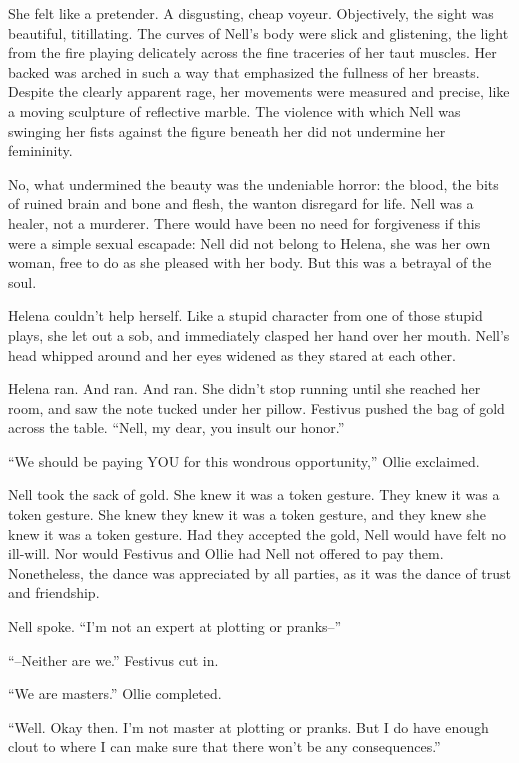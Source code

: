 She felt like a pretender. A disgusting, cheap voyeur. Objectively, the sight was beautiful, titillating. The curves of Nell’s body were slick and glistening, the light from the fire playing delicately across the fine traceries of her taut muscles. Her backed was arched in such a way that emphasized the fullness of her breasts. Despite the clearly apparent rage, her movements were measured and precise, like a moving sculpture of reflective marble. The violence with which Nell was swinging her fists against the figure beneath her did not undermine her femininity.

No, what undermined the beauty was the undeniable horror: the blood, the bits of ruined brain and bone and flesh, the wanton disregard for life. Nell was a healer, not a murderer. There would have been no need for forgiveness if this were a simple sexual escapade: Nell did not belong to Helena, she was her own woman, free to do as she pleased with her body. But this was a betrayal of the soul.

Helena couldn’t help herself. Like a stupid character from one of those stupid plays, she let out a sob, and immediately clasped her hand over her mouth. Nell’s head whipped around and her eyes widened as they stared at each other.

Helena ran. And ran. And ran. She didn’t stop running until she reached her room, and saw the note tucked under her pillow.
\simpeline
{}
Festivus pushed the bag of gold across the table. “Nell, my dear, you insult our honor.”

“We should be paying YOU for this wondrous opportunity,” Ollie exclaimed.

Nell took the sack of gold. She knew it was a token gesture. They knew it was a token gesture. She knew they knew it was a token gesture, and they knew she knew it was a token gesture. Had they accepted the gold, Nell would have felt no ill-will. Nor would Festivus and Ollie had Nell not offered to pay them. Nonetheless, the dance was appreciated by all parties, as it was the dance of trust and friendship.

Nell spoke. “I’m not an expert at plotting or pranks–”

“–Neither are we.” Festivus cut in.

“We are masters.” Ollie completed.

“Well. Okay then. I’m not master at plotting or pranks. But I do have enough clout to where I can make sure that there won’t be any consequences.”

